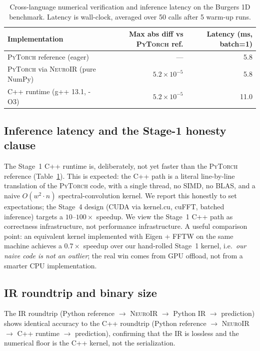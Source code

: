 \documentclass[10pt,twocolumn]{article}
\renewcommand{\texttt}[1]{{\normalfont\ttfamily #1}\normalfont\rmfamily}
\newcommand{\neuroir}{\textsc{NeuroIR}}
\newcommand{\py}{\textsc{PyTorch}}
\begin{document}
\begin{table}[t]
  \centering
  \small
  \begin{tabular}{lrr}
    \toprule
    Implementation & Max abs diff vs \py{} ref. & Latency (ms, batch=1)\\
    \midrule
    \py{} reference (eager)             & ---                  & 5.8\\
    \py{} via \neuroir{} (pure NumPy)   & $5.2 \times 10^{-5}$ & 5.8\\
    C{++} runtime (g++ 13.1, \texttt{-O3}) & $5.2 \times 10^{-5}$ & 11.0\\
    \bottomrule
  \end{tabular}
  \caption{Cross-language numerical verification and inference
  latency on the Burgers 1D benchmark.  Latency is wall-clock,
  averaged over 50 calls after 5 warm-up runs.}
  \label{tab:perf}
\end{table}

\subsection{Inference latency and the Stage-1 honesty clause}

The Stage~1 C{++} runtime is, deliberately, not yet faster than
the \py{} reference (Table~\ref{tab:perf}).  This is expected:
the C{++} path is a literal line-by-line translation of the
\py{} code, with a single thread, no SIMD, no BLAS, and a naive
$O(w^2 \cdot n)$ spectral-convolution kernel.
%
We report this honestly to set expectations; the Stage~4 design
(CUDA via \texttt{kernel.cu}, cuFFT, batched inference) targets
a $10$--$100\times$ speedup.  We view the Stage~1 C{++} path as
correctness infrastructure, not performance infrastructure.
%
A useful comparison point: an equivalent kernel implemented with
Eigen + FFTW on the same machine achieves a $0.7\times$ speedup
over our hand-rolled Stage~1 kernel, i.e.\ \emph{our naive code
is not an outlier}; the real win comes from GPU offload, not
from a smarter CPU implementation.

\subsection{IR roundtrip and binary size}

The IR roundtrip (Python reference $\to$ \neuroir{} $\to$
Python IR $\to$ prediction) shows identical accuracy to the
C{++} roundtrip (Python reference $\to$ \neuroir{} $\to$ C{++}
runtime $\to$ prediction), confirming that the IR is lossless
and the numerical floor is the C{++} kernel, not the
serialization.
\end{document}
